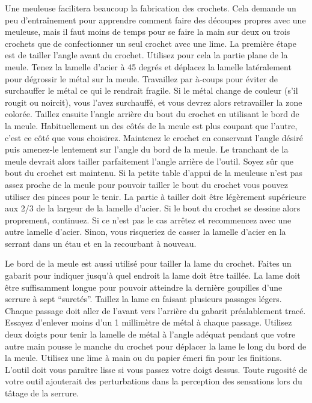 \documentclass[a4paper,french,11pt,twoside]{report}
\begin{document}
Une meuleuse facilitera beaucoup la fabrication des crochets. Cela demande un peu d'entraînement pour apprendre comment faire des découpes propres avec une meuleuse, mais il faut moins de temps pour se faire la main sur deux ou trois crochets que de confectionner un seul crochet avec une lime. La première étape est de tailler l'angle avant du crochet. Utilisez pour cela la partie plane de la meule. Tenez la lamelle d'acier à 45 degrés et déplacez la lamelle latéralement pour dégrossir le métal sur la meule. Travaillez par à-coups pour éviter de surchauffer le métal ce qui le rendrait fragile. Si le métal change de couleur (s'il rougit ou noircit), vous l'avez surchauffé, et vous devrez alors retravailler la zone colorée. Taillez ensuite l'angle arrière du bout du crochet en utilisant le bord de la meule. Habituellement un des côtés de la meule est plus coupant que l'autre, c'est ce côté que vous choisirez. Maintenez le crochet en conservant l'angle désiré puis amenez-le lentement sur l'angle du bord de la meule. Le tranchant de la meule devrait alors tailler parfaitement l'angle arrière de l'outil. Soyez sûr que bout du crochet est maintenu. Si la petite table d'appui de la meuleuse n'est pas assez proche de la meule pour pouvoir tailler le bout du crochet vous pouvez utiliser des pinces pour le tenir. La partie à tailler doit être légèrement supérieure aux 2/3 de la largeur de la lamelle d'acier. Si le bout du crochet se dessine alors proprement, continuez. Si ce n'est pas le cas arrêtez et recommencez avec une autre lamelle d'acier. Sinon, vous risqueriez de casser la lamelle d'acier en la serrant dans un étau et en la recourbant à nouveau.

Le bord de la meule est aussi utilisé pour tailler la lame du crochet. Faites un gabarit pour indiquer jusqu'à quel endroit la lame doit être taillée. La lame doit être suffisamment longue pour pouvoir atteindre la dernière goupilles d'une serrure à sept \enquote{suretés}. Taillez la lame en faisant plusieurs passages légers. Chaque passage doit aller de l'avant vers l'arrière du gabarit préalablement tracé. Essayez d'enlever moins d'un 1 millimètre de métal à chaque passage. Utilisez deux doigts pour tenir la lamelle de métal à l'angle adéquat pendant que votre autre main pousse le manche du crochet pour déplacer la lame le long du bord de la meule.
Utilisez une lime à main ou du papier émeri fin pour les finitions. L'outil doit vous paraître lisse si vous passez votre doigt dessus. Toute rugosité de votre outil ajouterait des perturbations dans la perception des sensations lors du tâtage de la serrure.
\end{document}
